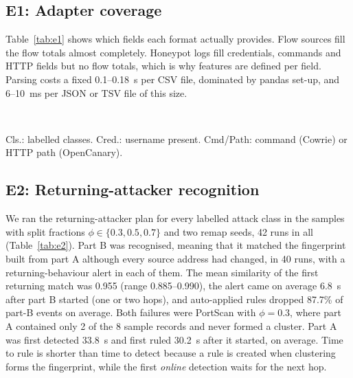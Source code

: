 \documentclass[conference]{IEEEtran}
\begin{document}
\subsection{E1: Adapter coverage}
Table~\ref{tab:e1} shows which fields each format actually provides. Flow sources fill the flow totals almost completely. Honeypot logs fill credentials, commands and HTTP fields but no flow totals, which is why features are defined per field. Parsing costs a fixed 0.1--0.18~s per CSV file, dominated by pandas set-up, and 6--10~ms per JSON or TSV file of this size.

\begin{table}[t]
\centering
\caption{E1: Field coverage per adapter (share of records with the field)}
\label{tab:e1}
\footnotesize
\setlength{\tabcolsep}{2.6pt}
\\[2pt]
\raggedright\scriptsize Cls.: labelled classes. Cred.: username present. Cmd/Path: command (Cowrie) or HTTP path (OpenCanary).
\end{table}

\subsection{E2: Returning-attacker recognition}
We ran the returning-attacker plan for every labelled attack class in the samples with split fractions $\phi\in\{0.3,0.5,0.7\}$ and two remap seeds, 42 runs in all (Table~\ref{tab:e2}). Part B was recognised, meaning that it matched the fingerprint built from part A although every source address had changed, in 40 runs, with a returning-behaviour alert in each of them. The mean similarity of the first returning match was 0.955 (range 0.885--0.990), the alert came on average 6.8~s after part B started (one or two hops), and auto-applied rules dropped 87.7\% of part-B events on average. Both failures were PortScan with $\phi=0.3$, where part A contained only 2 of the 8 sample records and never formed a cluster. Part A was first detected 33.8~s and first ruled 30.2~s after it started, on average. Time to rule is shorter than time to detect because a rule is created when clustering forms the fingerprint, while the first \emph{online} detection waits for the next hop.
\end{document}
